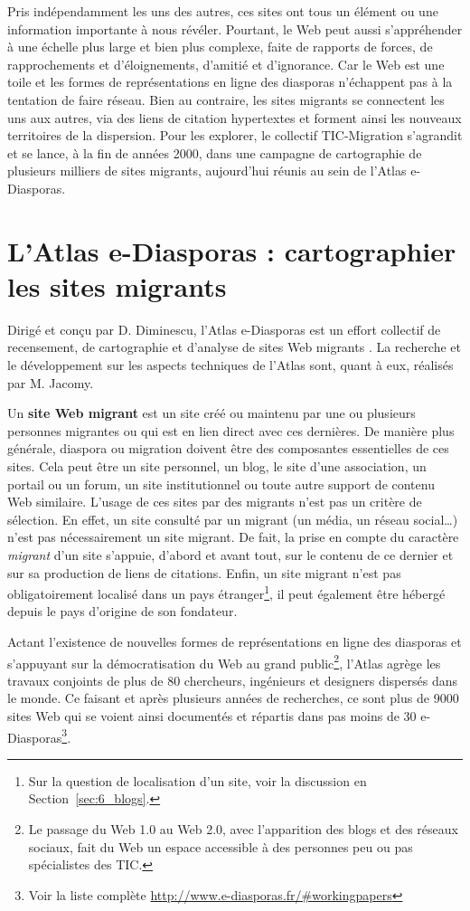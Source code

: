 \documentclass[symmetric,justified,marginals=raggedouter]{tufte-book}
\begin{document}
Pris indépendamment les uns des autres, ces sites ont tous un élément ou une information importante à nous révéler. Pourtant, le Web peut aussi s'appréhender à une échelle plus large et bien plus complexe, faite de rapports de forces, de rapprochements et d'éloignements, d'amitié et d'ignorance. Car le Web est une toile et les formes de représentations en ligne des diasporas n'échappent pas à la tentation de faire réseau. Bien au contraire, les sites migrants se connectent les uns aux autres, via des liens de citation hypertextes et forment ainsi les nouveaux territoires de la dispersion. Pour les explorer, le collectif TIC-Migration s'agrandit et se lance, à la fin de années 2000, dans une campagne de cartographie de plusieurs milliers de sites migrants, aujourd'hui réunis au sein de l'Atlas e-Diasporas.  

\section{L'Atlas e-Diasporas : cartographier les sites migrants}
\label{sec:2_atlas}

\noindent Dirigé et conçu par D. Diminescu, l'Atlas e-Diasporas est un effort collectif de recensement, de cartographie et d'analyse de sites Web migrants \citep{diminescu_e-diasporas_2012}. La recherche et le développement sur les aspects techniques de l'Atlas sont, quant à eux, réalisés par M. Jacomy. 

Un \textbf{site Web migrant} est un site créé ou maintenu par une ou plusieurs personnes migrantes ou qui est en lien direct avec ces dernières. De manière plus générale, diaspora ou migration doivent être des composantes essentielles de ces sites. Cela peut être un site personnel, un blog, le site d'une association, un portail ou un forum, un site institutionnel ou toute autre support de contenu Web similaire. L'usage de ces sites par des migrants n'est pas un critère de sélection. En effet, un site consulté par un migrant (un média, un réseau social\ldots{}) n'est pas nécessairement un site migrant. De fait, la prise en compte du caractère \textit{migrant} d'un site s'appuie, d'abord et avant tout, sur le contenu de ce dernier et sur sa production de liens de citations. Enfin, un site migrant n'est pas obligatoirement localisé dans un pays étranger\footnote{\RaggedOuter Sur la question de localisation d'un site, voir la discussion en Section~\ref{sec:6_blogs}.}, il peut également être hébergé depuis le pays d'origine de son fondateur. 

Actant l'existence de nouvelles formes de représentations en ligne des diasporas et s'appuyant sur la démocratisation du Web au grand public\footnote{\RaggedOuter Le passage du Web 1.0 au Web 2.0, avec l'apparition des blogs et des réseaux sociaux, fait du Web un espace accessible à des personnes peu ou pas spécialistes des TIC.}, l'Atlas agrège les travaux conjoints de plus de 80 chercheurs, ingénieurs et designers dispersés dans le monde. Ce faisant et après plusieurs années de recherches, ce sont plus de 9000 sites Web qui se voient ainsi documentés et répartis dans pas moins de 30 e-Diasporas\footnote{\RaggedOuter Voir la liste complète \url{http://www.e-diasporas.fr/\#workingpapers}}.
\end{document}
